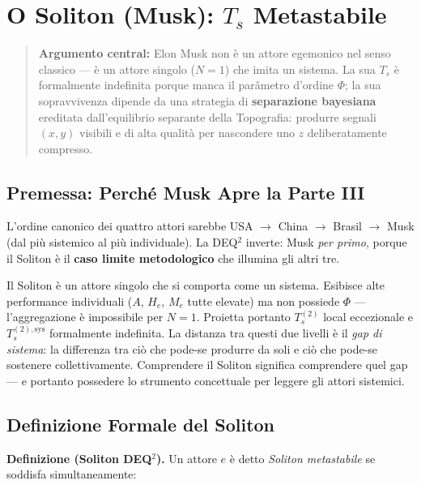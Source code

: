\chapter{\texorpdfstring{O Soliton (Musk): \(T_s\)
Metastabile}{O Soliton (Musk): T\_s Metastabile}}\label{il-solitone-musk-t_s-metastabile}

\begin{quote}
\textbf{Argumento central:} Elon Musk non è un attore egemonico nel
senso classico --- è un attore singolo (\(N=1\)) che imita un sistema.
La sua \(T_s\) è formalmente indefinita porque manca il parâmetro
d'ordine \(\Phi\); la sua sopravvivenza dipende da una strategia di
\textbf{separazione bayesiana} ereditata dall'equilibrio separante della
Topografia: produrre segnali \((x, y)\) visibili e di alta qualità per
nascondere uno \(z\) deliberatamente compresso.
\end{quote}



\section{Premessa: Perché Musk Apre la Parte
III}\label{premessa-perchuxe9-musk-apre-la-parte-iii}

L'ordine canonico dei quattro attori sarebbe USA $\to$ China $\to$ Brasil $\to$ Musk
(dal più sistemico al più individuale). La DEQ$^2$ inverte: Musk \emph{per
primo}, porque il Soliton è il \textbf{caso limite metodologico} che
illumina gli altri tre.

Il Soliton è un attore singolo che si comporta come un sistema.
Esibisce alte performance individuali (\(A\), \(H_e\), \(M_e\) tutte
elevate) ma non possiede \(\Phi\) --- l'aggregazione è impossibile per
\(N = 1\). Proietta portanto \(T_s^{(2)}\) local eccezionale e
\(T_s^{(2),\text{sys}}\) formalmente indefinita. La distanza tra questi
due livelli è il \emph{gap di sistema}: la differenza tra ciò che pode-se
produrre da soli e ciò che pode-se sostenere collettivamente. Comprendere
il Soliton significa comprendere quel gap --- e portanto possedere lo
strumento concettuale per leggere gli attori sistemici.



\section{Definizione Formale del
Soliton}\label{definição-formale-del-solitone}

\Hypoth{} \textbf{Definizione (Soliton DEQ$^2$).} Un attore \(e\) è detto
\emph{Soliton metastabile} se soddisfa simultaneamente:

